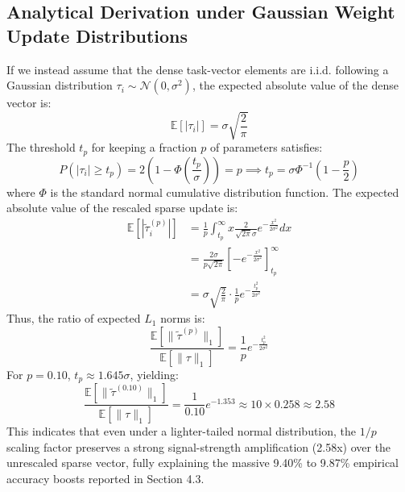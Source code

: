 \subsection{Analytical Derivation under Gaussian Weight Update Distributions}
If we instead assume that the dense task-vector elements are i.i.d. following a Gaussian distribution $\tau_i \sim \mathcal{N}(0, \sigma^2)$, the expected absolute value of the dense vector is:
\begin{equation}
\mathbb{E}[|\tau_i|] = \sigma \sqrt{\frac{2}{\pi}}
\end{equation}
The threshold $t_p$ for keeping a fraction $p$ of parameters satisfies:
\begin{equation}
P(|\tau_i| \geq t_p) = 2 \left(1 - \Phi\left(\frac{t_p}{\sigma}\right)\right) = p \implies t_p = \sigma \Phi^{-1}\left(1 - \frac{p}{2}\right)
\end{equation}
where $\Phi$ is the standard normal cumulative distribution function. The expected absolute value of the rescaled sparse update is:
\begin{align}
\mathbb{E}[|\tilde{\tau}_i^{(p)}|] &= \frac{1}{p} \int_{t_p}^{\infty} x \frac{2}{\sqrt{2\pi}\sigma} e^{-\frac{x^2}{2\sigma^2}} dx \nonumber \\
&= \frac{2\sigma}{p\sqrt{2\pi}} \left[ -e^{-\frac{x^2}{2\sigma^2}} \right]_{t_p}^{\infty} \nonumber \\
&= \sigma \sqrt{\frac{2}{\pi}} \cdot \frac{1}{p} e^{-\frac{t_p^2}{2\sigma^2}}
\end{align}
Thus, the ratio of expected $L_1$ norms is:
\begin{equation}
\frac{\mathbb{E}[\|\tilde{\tau}^{(p)}\|_1]}{\mathbb{E}[\|\tau\|_1]} = \frac{1}{p} e^{-\frac{t_p^2}{2\sigma^2}}
\end{equation}
For $p = 0.10$, $t_p \approx 1.645\sigma$, yielding:
\begin{equation}
\frac{\mathbb{E}[\|\tilde{\tau}^{(0.10)}\|_1]}{\mathbb{E}[\|\tau\|_1]} = \frac{1}{0.10} e^{-1.353} \approx 10 \times 0.258 \approx 2.58
\end{equation}
This indicates that even under a lighter-tailed normal distribution, the $1/p$ scaling factor preserves a strong signal-strength amplification (2.58x) over the unrescaled sparse vector, fully explaining the massive 9.40\% to 9.87\% empirical accuracy boosts reported in Section 4.3.

